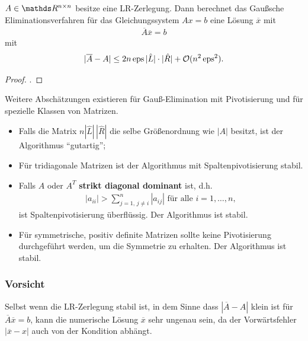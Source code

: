 \begin{Satze}[Sautter 1971]
  $ A \in \R^{n\times n}$ besitze eine LR-Zerlegung.  Dann berechnet das
  Gaußsche Eliminationsverfahren für das Gleichungssystem
  $Ax = b$ eine Lösung $\overline{x}$ mit 
  \begin{gather*} \overline{A} \overline{x} = b\end{gather*}
  mit
  \begin{gather*} 
    |\overline{A}-A|  \leq  2n\operatorname{eps}
    |\hat{L}| \cdot |\hat{R}| + \mathcal{O}( n^2 \operatorname{eps}^2).
  \end{gather*}
\end{Satze}

\begin{proof}
  \cite[siehe][]{deuflhardhohmann}.
\end{proof}

Weitere Abschätzungen existieren für Gauß-Elimination mit 
Pivotisierung und für spezielle Klassen von Matrizen.

\label{III.3.13}
\begin{itemize}
\item Falls die Matrix $n | \hat{ L} | \,  |\hat{ R}|$ die
  selbe Größenordnung wie $| A|$ besitzt, ist der
  Algorithmus \enquote{gutartig};
\item Für tridiagonale Matrizen  ist der Algorithmus mit
  Spaltenpivotisierung stabil.
\item Falls $ A$ oder $ A^T$  \textbf{strikt diagonal
    dominant} ist, d.h. 
  \begin{gather*}
    | a_{ii} | > \sum\limits_{j=1 ,\, j \not = i}^{n} | a_{ij}| 
    \mbox{ für alle } i = 1, \ldots, n,
  \end{gather*}
  ist Spaltenpivotisierung überflüssig. Der Algorithmus ist stabil.
\item Für symmetrische, positiv definite Matrizen sollte keine Pivotisierung
  durchgeführt werden, um die Symmetrie zu erhalten.
  Der Algorithmus ist stabil.
\end{itemize}

\subsubsection{Vorsicht}
Selbst wenn die LR-Zerlegung stabil ist, in dem Sinne dass
$| \overline{ A} - A|$ klein ist für
$ \overline{ A}\overline{ x}  =  b $, 
kann die numerische Lösung $\overline{ x}$ sehr
ungenau sein, da der Vorwärtsfehler $| \overline{ x} - {  x}| $ auch von der
Kondition abhängt.

